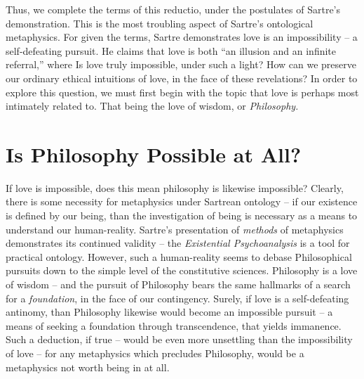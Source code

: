 Thus, we complete the terms of this reductio, under the postulates of Sartre's demonstration. This is the most troubling aspect of Sartre's ontological metaphysics. For given the terms, Sartre demonstrates love is an impossibility -- a self-defeating pursuit. He claims that love is both \enquote{an illusion and an infinite referral,} where  Is love truly impossible, under such a light? How can we preserve our ordinary ethical intuitions of love, in the face of these revelations? In order to explore this question, we must first begin with the topic that love is perhaps most intimately related to. That being the love of wisdom, or \emph{Philosophy.}

\section{Is Philosophy Possible at All?}

If love is impossible, does this mean philosophy is likewise impossible? Clearly, there is some necessity for metaphysics under Sartrean ontology -- if our existence is defined by our being, than the investigation of being is necessary as a means to understand our human-reality. Sartre's presentation of \emph{methods} of metaphysics demonstrates its continued validity -- the \emph{Existential Psychoanalysis} \autocite[723]{Sartre} is a tool for practical ontology. However, such a human-reality seems to debase Philosophical pursuits down to the simple level of the constitutive sciences. Philosophy is a love of wisdom -- and the pursuit of Philosophy bears the same hallmarks of a search for a \emph{foundation}, in the face of our contingency. Surely, if love is a self-defeating antinomy, than Philosophy likewise would become an impossible pursuit -- a means of seeking a foundation through transcendence, that yields immanence. Such a deduction, if true -- would be even more unsettling than the impossibility of love -- for any metaphysics which precludes Philosophy, would be a metaphysics not worth being in at all.



